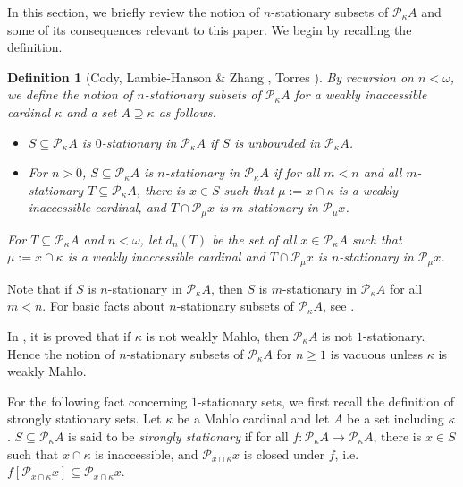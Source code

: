 \documentclass[a4paper,12pt,reqno,oneside]{amsart}
\theoremstyle{plain}
\newtheorem*{definition*}{Definition}
\newcommand{\mcal}{\mathcal}
\begin{document}
In this section, we briefly review the notion of $n$-stationary subsets of $\mcal{P}_\kappa A$ and some of its consequences relevant to this paper. We begin by recalling the definition.


\begin{definition*}[Cody, Lambie-Hanson \& Zhang \cite{CLHZ}, Torres \cite{T}]
By recursion on $n < \omega$, we define the notion of $n$-stationary subsets of $\mcal{P}_\kappa A$ for a weakly inaccessible cardinal $\kappa$ and a set $A \supseteq \kappa$ as follows.
\begin{itemize}
\item $S\subseteq \mcal{P}_{\kappa}{A}$ is $0$-\emph{stationary} in $\mcal{P}_{\kappa}{A}$ if  $S$ is unbounded in $\mcal{P}_{\kappa}{A}$.
\item For $n > 0$, $S\subseteq \mcal{P}_{\kappa}{A}$ is $n$-\emph{stationary} in $\mcal{P}_{\kappa}{A}$ if for all $m<n$ and all $m$-stationary $T \subseteq \mcal{P}_{\kappa}{A}$, there is $x \in S$ such that $\mu := x \cap \kappa$ is a weakly inaccessible cardinal, and $T\cap \mcal{P}_{\mu}{x}$ is $m$-stationary in $\mcal{P}_{\mu}{x}$.
\end{itemize}
For $T\subseteq \mcal{P}_{\kappa}{A}$ and $n < \omega$, let $d_n(T)$ be the set of all $x \in \mcal{P}_{\kappa}{A}$ such that $\mu:= x \cap \kappa$ is a weakly inaccessible cardinal and $T \cap \mcal{P}_{\mu}{x}$ is $n$-stationary in $\mcal{P}_{\mu}{x}$.
\end{definition*}


Note that if $S$ is $n$-stationary in $\mcal{P}_\kappa A$, then $S$ is $m$-stationary in $\mcal{P}_\kappa A$ for all $m < n$. For basic facts about  $n$-stationary subsets of $\mcal{P}_\kappa A$, see \cite{CLHZ, T}.

In \cite{T}, it is proved that if $\kappa$ is not weakly Mahlo, then $\mcal{P}_\kappa A$ is not $1$-stationary. Hence the notion of $n$-stationary subsets of $\mcal{P}_\kappa A$ for $n \geq 1$ is vacuous unless $\kappa$ is weakly Mahlo.

For the following fact concerning $1$-stationary sets, we first recall the definition of strongly stationary sets. Let $\kappa$ be a Mahlo cardinal and let $A$ be a set including $\kappa$. $S\subseteq \mcal{P}_{\kappa}{A}$ is said to be \emph{strongly stationary} if for all $f : \mcal{P}_{\kappa}{A} \rightarrow \mcal{P}_{\kappa}{A}$, there is $x \in S$ such that $x \cap \kappa$ is inaccessible, and $\mcal{P}_{x \cap \kappa} x$ is closed under $f$, i.e.~$f[\mcal{P}_{x \cap \kappa}{x}] \subseteq \mcal{P}_{x \cap \kappa}{x}$.
\end{document}
